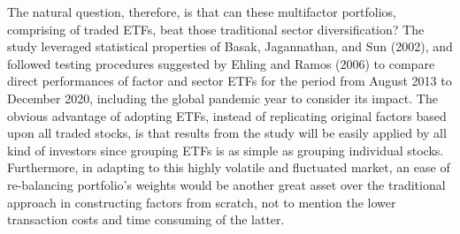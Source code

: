 The natural question, therefore, is that can these multifactor portfolios, comprising of traded ETFs, beat those traditional sector diversification? The study leveraged statistical properties of Basak, Jagannathan, and Sun (2002), and followed testing procedures suggested by Ehling and Ramos (2006) to compare direct performances of factor and sector ETFs for the period from August 2013 to December 2020, including the global pandemic year to consider its impact. The obvious advantage of adopting ETFs, instead of replicating original factors based upon all traded stocks, is that results from the study will be easily applied by all kind of investors since grouping ETFs is as simple as grouping individual stocks. Furthermore, in adapting to this highly volatile and fluctuated market, an ease of re-balancing portfolio's weights would be another great asset over the traditional approach in constructing factors from scratch, not to mention the lower transaction costs and time consuming of the latter. 
